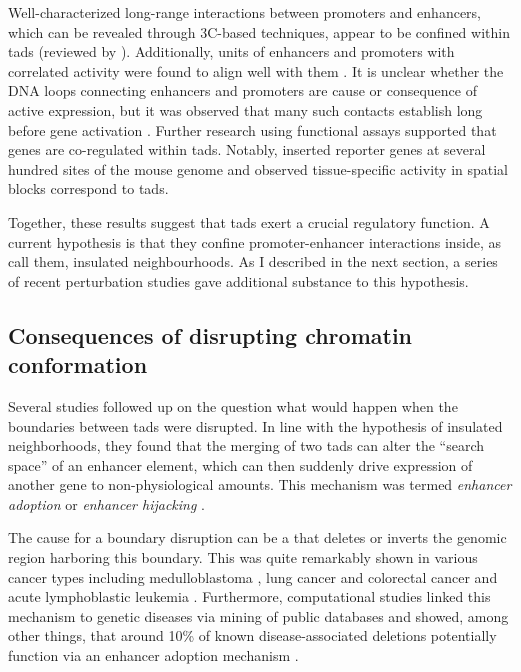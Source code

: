 Well-characterized long-range interactions between promoters and enhancers,
which can be revealed through 3C-based techniques, appear to be confined
within \acp{tad} (reviewed by \citet{Smallwood2013}). Additionally, units of
enhancers and promoters with correlated activity were found to align well
with them \citep{Shen2012}.
It is unclear whether the DNA loops connecting enhancers and promoters are cause
or consequence of active expression, but it was observed that many such contacts
establish long before gene activation \citep{Ghavi-Helm2014}.
Further research using functional assays supported that genes are co-regulated
within \acp{tad}. Notably, \citet{Symmons2014} inserted reporter genes at
several hundred sites of the mouse genome and observed tissue-specific activity
in spatial blocks correspond to \acp{tad}.

Together, these results suggest that \acp{tad} exert a crucial regulatory
function. A current hypothesis is that they confine promoter-enhancer
interactions inside, as \citet{Ji2016} call them, insulated neighbourhoods. As
I described in the next section, a series of recent perturbation studies
gave additional substance to this hypothesis.





\subsection{Consequences of disrupting chromatin conformation}
\label{sec:disrupting_tads}

Several studies followed up on the question what would happen when the boundaries
between \acp{tad} were disrupted. In line with the hypothesis of insulated
neighborhoods, they found that the merging of two \acp{tad} can alter the
``search space'' of an enhancer element, which can then suddenly drive
expression of another gene to non-physiological amounts. This mechanism was
termed \emph{enhancer adoption} \citep{Lettice2011} or \emph{enhancer
hijacking} \citep{Northcott2014}.

The cause for a \tad boundary disruption can be a \sv that deletes or inverts
the genomic region harboring this boundary. This was quite remarkably shown in
various cancer types including medulloblastoma \citep{Northcott2014}, lung cancer
and colorectal cancer \citep{Weischenfeldt2016} and acute lymphoblastic leukemia
\citep{Hnisz2016}. Furthermore, computational studies linked this mechanism to
genetic diseases via mining of public databases and showed, among other things,
that around 10\% of known disease-associated deletions potentially function via
an enhancer adoption mechanism \citep{Ibn-Salem2014,Li2016,Zepeda-Mendoza2017}.

